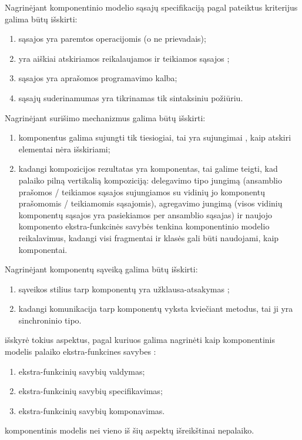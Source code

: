 Nagrinėjant  komponentinio modelio sąsajų
specifikaciją pagal \cite[599]{classification-framework-for-scm}
pateiktus kriterijus galima būtų išskirti:
\begin{enumerate}
  \item sąsajos yra paremtos operacijomis (o ne prievadais);
  \item yra aiškiai atskiriamos reikalaujamos 
    ir teikiamos sąsajos ;
  \item sąsajos yra aprašomos  programavimo kalba;
  \item sąsajų suderinamumas yra tikrinamas tik sintaksiniu
    požiūriu.
\end{enumerate}
Nagrinėjant surišimo mechanizmus galima būtų išskirti:
\begin{enumerate}
  \item komponentus galima sujungti tik tiesiogiai, tai yra sujungimai
    , kaip atskiri elementai nėra išskiriami;
  \item kadangi kompozicijos rezultatas yra komponentas, tai
    galime teigti, kad  palaiko pilną vertikalią
    kompoziciją: delegavimo tipo jungimą (ansamblio prašomos /
    teikiamos sąsajos sujungiamos su vidinių jo komponentų
    prašomomis / teikiamomis sąsajomis), agregavimo jungimą
    (visos vidinių komponentų sąsajos yra pasiekiamos per ansamblio
    sąsajas) ir naujojo komponento ekstra-funkcinės savybės
    tenkina komponentinio modelio reikalavimus, kadangi visi
     fragmentai ir klasės gali būti naudojami,
    kaip komponentai.
\end{enumerate}
Nagrinėjant komponentų sąveiką galima būtų išskirti:
\begin{enumerate}
  \item sąveikos stilius tarp komponentų yra užklausa-atsakymas
    ;
  \item kadangi komunikacija tarp komponentų vyksta kviečiant metodus,
    tai ji yra sinchroninio tipo.
\end{enumerate}

\cite[602]{classification-framework-for-scm} išskyrė tokius
aspektus, pagal kuriuos galima nagrinėti kaip komponentinis
modelis palaiko ekstra-funkcines savybes :
\begin{enumerate}
  \item ekstra-funkcinių savybių valdymas;
  \item ekstra-funkcinių savybių specifikavimas;
  \item ekstra-funkcinių savybių komponavimas.
\end{enumerate}
 komponentinis modelis nei vieno iš šių aspektų
išreikštinai nepalaiko.


